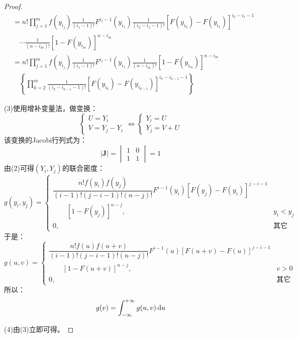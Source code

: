 \begin{proof}
\begin{align*}
		&=n!\prod_{j=1}^{m}f(y_{i_j})\frac{1}{(i_1-1)!}F^{i_1-1}(y_{i_1})\frac{1}{(i_2-i_1-1)!}[F(y_{i_2})-F(y_{i_1})]^{i_2-i_1-1} \\
		&\quad\cdots\frac{1}{(n-i_m)!}[1-F(y_{i_m})]^{n-i_m} \\
		&=n!\prod_{j=1}^{m}f(y_{i_j})\frac{1}{(i_1-1)!}F^{i_1-1}(y_{i_1})\frac{1}{(n-i_m)!}[1-F(y_{i_m})]^{n-i_m} \\
		&\quad\left\{\prod_{k=2}^{m}\frac{1}{(i_k-i_{k-1}-1)!}[F(y_{i_k})-F(y_{i_{k-1}})]^{i_k-i_{k-1}-1}\right\}
	\end{align*}\par
	(3)使用增补变量法，做变换：
	\begin{equation*}
		\begin{cases}
			U=Y_i \\
			V=Y_j-Y_i
		\end{cases}
		\Leftrightarrow
		\begin{cases}
			Y_i=U \\
			Y_j=V+U
		\end{cases}
	\end{equation*}
	该变换的Jacobi行列式为：
	\begin{equation*}
		|\mathbf{J}|=
		\begin{vmatrix}
			1 & 0 \\
			1 & 1
		\end{vmatrix}
		=1
	\end{equation*}
	由(2)可得$(Y_i,Y_j)$的联合密度：
	\begin{equation*}
		g(y_i,y_j)=
		\begin{cases}
			\dfrac{n!f(y_i)f(y_j)}{(i-1)!(j-i-1)!(n-j)!}F^{i-1}(y_i)[F(y_j)-F(y_i)]^{j-i-1} \\
			\quad\quad[1-F(y_j)]^{n-j},&y_i<y_j \\
			0,&\text{其它}
		\end{cases}
	\end{equation*}
	于是：
	\begin{equation*}
		g(u,v)=
		\begin{cases}
			\dfrac{n!f(u)f(u+v)}{(i-1)!(j-i-1)!(n-j)!}F^{i-1}(u)[F(u+v)-F(u)]^{j-i-1} \\
			\quad\quad[1-F(u+v)]^{n-j},&v>0 \\
			0,&\text{其它}
		\end{cases}
	\end{equation*}
	所以：
	\begin{equation*}
		g(v)=\int_{-\infty}^{+\infty}g(u,v)\mathop{}\!\mathrm{d} u
	\end{equation*}\par
	(4)由(3)立即可得。
\end{proof}

